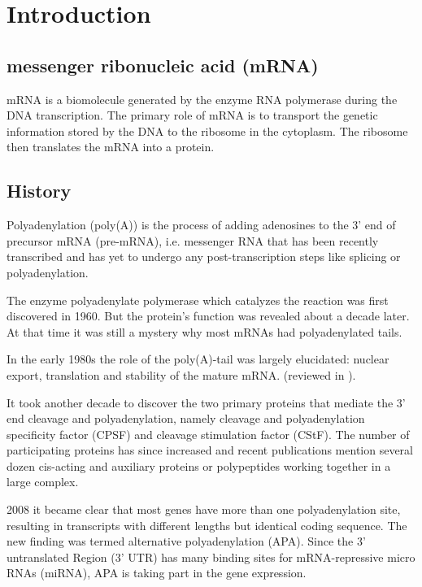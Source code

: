 \section{Introduction}

\subsection{messenger ribonucleic acid (mRNA)}
mRNA is a biomolecule generated by the enzyme RNA polymerase during the DNA transcription. The primary role of mRNA is to transport the genetic information stored by the DNA to the ribosome in the cytoplasm. The ribosome then translates the mRNA into a protein. 

\subsection{History}
Polyadenylation (poly(A)) is the process of adding adenosines to the 3' end of precursor mRNA (pre-mRNA), i.e. messenger RNA that has been recently transcribed and has yet to undergo any post-transcription steps like splicing or polyadenylation.

The enzyme polyadenylate polymerase which catalyzes the reaction was first discovered in 1960. \cite{pmid13819354} But the protein's function was revealed about a decade later. \cite{pmid5288383} At that time it was still a mystery why most mRNAs had polyadenylated tails. 

In the early 1980s the role of the poly(A)-tail was largely elucidated: nuclear export, translation and stability of the mature mRNA. (reviewed in \cite{pmid6111419}). 

It took another decade to discover the two primary proteins that mediate the 3' end cleavage and polyadenylation, namely cleavage and polyadenylation specificity factor (CPSF) and cleavage stimulation factor (CStF). The number of participating proteins has since increased and recent publications mention several dozen cis-acting and auxiliary proteins or polypeptides working together in a large complex. \cite{pmid23774734} 

2008 it became clear that most genes have more than one polyadenylation site, resulting in transcripts with different lengths but identical coding sequence. \cite{pmid18411206} The new finding was termed alternative polyadenylation (APA). Since the 3' untranslated Region (3' UTR) has many binding sites for mRNA-repressive micro RNAs (miRNA), APA is taking part in the gene expression. \cite{pmid18566288}
